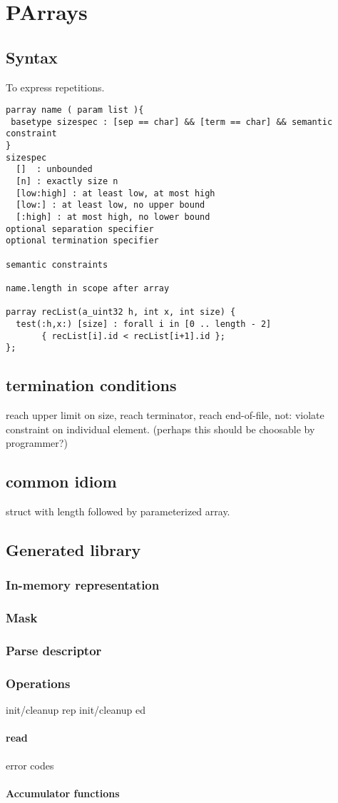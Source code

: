\chapter{PArrays}
\label{chap:arrays}
\section{Syntax}
To express repetitions.  

\begin{verbatim}
parray name ( param list ){
 basetype sizespec : [sep == char] && [term == char] && semantic constraint
}
sizespec 
  []  : unbounded
  [n] : exactly size n
  [low:high] : at least low, at most high
  [low:] : at least low, no upper bound
  [:high] : at most high, no lower bound
optional separation specifier
optional termination specifier

semantic constraints

name.length in scope after array

parray recList(a_uint32 h, int x, int size) {
  test(:h,x:) [size] : forall i in [0 .. length - 2]
       { recList[i].id < recList[i+1].id };
};
\end{verbatim}
\section{termination conditions}
reach upper limit on size, reach terminator, reach end-of-file, 
not: violate constraint on individual element. (perhaps this should be
choosable by programmer?)


\section{common idiom}
struct with length followed by parameterized array.


\section{Generated library}
\subsection{In-memory representation}
\label{sec:arrays-rep}
\subsection{Mask}
\label{sec:arrays-masks}
\subsection{Parse descriptor}
\label{sec:arrays-parse-descriptors}
\subsection{Operations}
init/cleanup rep
init/cleanup ed
\subsubsection{read}
  error codes
\subsubsection{Accumulator functions}

